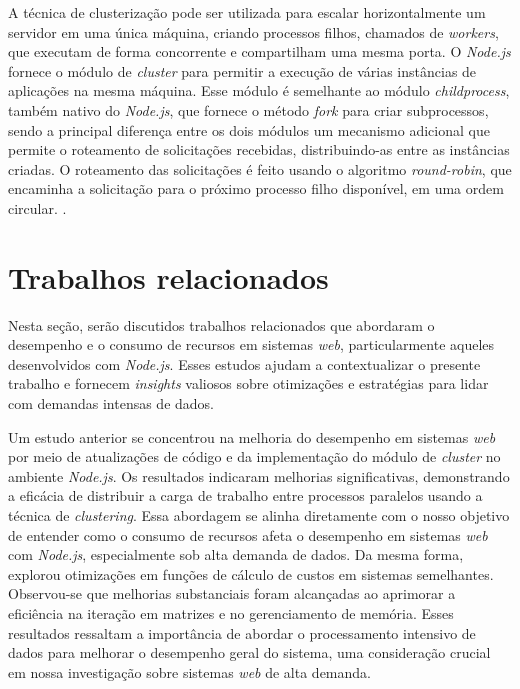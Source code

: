 \documentclass[12pt]{article}
\begin{document}
A técnica de clusterização pode ser utilizada para escalar horizontalmente um servidor em uma única máquina,
criando processos filhos, chamados de \textit{workers}, que executam de forma concorrente e compartilham uma mesma porta.
O \textit{Node.js} fornece o módulo de \textit{cluster} para permitir a execução de várias instâncias de aplicações na
mesma máquina. Esse módulo é semelhante ao módulo \textit{child\textunderscore process}, também nativo do \textit{Node.js},
que fornece o método \textit{fork} para criar subprocessos, sendo a principal diferença entre os dois módulos
um mecanismo adicional que permite o roteamento de solicitações recebidas, distribuindo-as entre as instâncias
criadas. O roteamento das solicitações é feito usando o algoritmo \textit{round-robin}, que encaminha a solicitação
para o próximo processo filho disponível, em uma ordem circular. \cite[p. 76]{DISTRIBUTEDNODE}.

\section{Trabalhos relacionados}

Nesta seção, serão discutidos trabalhos relacionados que abordaram o desempenho e o consumo de recursos 
em sistemas \textit{web}, particularmente aqueles desenvolvidos com \textit{Node.js}. Esses estudos ajudam a contextualizar 
o presente trabalho e fornecem \textit{insights} valiosos sobre otimizações e estratégias para lidar com demandas 
intensas de dados.

Um estudo anterior \cite{CLUSTERTCC} se concentrou na melhoria do desempenho em sistemas \textit{web} por meio de atualizações 
de código e da implementação do módulo de \textit{cluster} no ambiente \textit{Node.js}. Os resultados indicaram melhorias 
significativas, demonstrando a eficácia de distribuir a carga de trabalho entre processos paralelos usando a 
técnica de \textit{clustering}. Essa abordagem se alinha diretamente com o nosso objetivo de entender como o consumo 
de recursos afeta o desempenho em sistemas \textit{web} com \textit{Node.js}, especialmente sob alta demanda de dados.
Da mesma forma, \cite{CLUSTERTCC} explorou otimizações em funções de cálculo de custos em sistemas 
semelhantes. Observou-se que melhorias substanciais foram alcançadas ao aprimorar a eficiência na 
iteração em matrizes e no gerenciamento de memória. Esses resultados ressaltam a importância de abordar o 
processamento intensivo de dados para melhorar o desempenho geral do sistema, uma consideração crucial em 
nossa investigação sobre sistemas \textit{web} de alta demanda.
\end{document}

